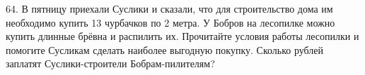64. В пятницу приехали Суслики и сказали, что для строительство дома им необходимо купить 13 чурбачков по 2 метра. У Бобров на лесопилке можно купить длинные брёвна и распилить их. Прочитайте условия работы лесопилки и помогите Сусликам сделать наиболее выгодную покупку. Сколько рублей заплатят Суслики-строители Бобрам-пилителям?
\begin{figure}[h]
\end{figure}\\

